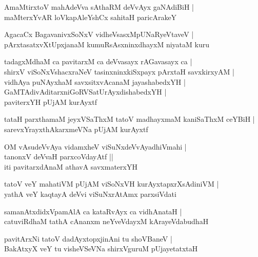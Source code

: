 \documentclass[twoside,12pt,openright]{book}
\newcounter{shloka}[chapter]
\begin{document}
\begin{shloka}%
AmaMtirxtoV mahAdeVva sAthaRM deVvAyx gaNAdiBiH |\\
maMterxYvAR loVkapAleYshCx sahitaH paricArakeY
\end{shloka}

\begin{shloka}%
AgacaCx BagavanivxSoNxV vidheVsasxMpUNaRyeVtaveV |\\
pArxtasatxvXtUpxjanaM kumuRsAsxninxdhayxM niyataM kuru
\end{shloka}

\begin{shloka}%
tadagxMdhaM ca pavitarxM ca deVvasayx rAGavasayx ca |\\
shirxV viSoNxVshacxraNeV tasinxninxkiSxpayx pArxtaH savxkirxyAM |\\
vidhAya puNAyxhaM savxsitxvAcanaM jayashabedxYH |\\
GaMTAdivAditarxniGoRVSatUrAyxdishabedxYH |\\
paviterxYH pUjAM kurAyxtf
\end{shloka}

\begin{shloka}%
tataH parxthamaM jeyxVSaThxM tatoV madhayxmaM kaniSaThxM ceYBiH |\\
sarevxYrayxthAkarxmeVNa pUjAM kurAyxtf
\end{shloka}

\begin{shloka}%
OM vAsudeVvAya vidamxheV viSuNxdeVvAyadhiVmahi |\\
tanonxV deVvaH parxcoVdayAtf ||\\
iti pavitarxdAnaM athavA savxmaterxYH
\end{shloka}

\begin{shloka}%
tatoV veY mahatiVM pUjAM viSoNxVH kurAyxtapxrXsAdiniVM |\\
yathA veY kaqtayA deVvi viSuNxrAtAmx parxsiVdati 
\end{shloka}

\begin{shloka}%
samanAtxdidxVpamAlA ca kataRvAyx ca vidhAnataH |\\
catuviRdhaM tathA cAnanxm neYveVdayxM kArayeVdabudhaH 
\end{shloka}

\begin{shloka}%
pavitArxNi tatoV dadAyxtopxjinAni tu shoVBaneV |\\
BakAtxyX veY tu visheVSeVNa shirxVguruM pUjayetatxtaH 
\end{shloka}
\end{document}
